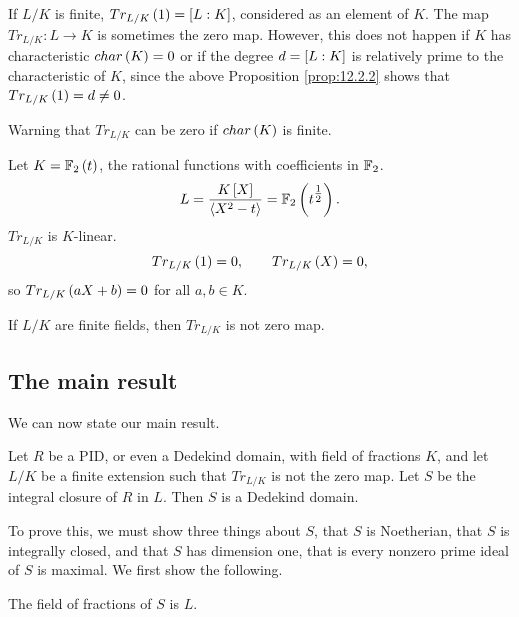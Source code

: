 \pagebreak

\begin{remark}
If $ L / K $ is finite, $ Tr_{L / K}\rb{1} = \sb{L : K} $, considered as an element of $ K $. The map $ Tr_{L / K} : L \to K $ is sometimes the zero map. However, this does not happen if $ K $ has characteristic $ char\rb{K} = 0 $ or if the degree $ d = \sb{L : K} $ is relatively prime to the characteristic of $ K $, since the above Proposition \ref{prop:12.2.2} shows that $ Tr_{L / K}\rb{1} = d \ne 0 $.
\end{remark}

Warning that $ Tr_{L / K} $ can be zero if $ char\rb{K} $ is finite.

\begin{example*}
Let $ K = \F_2\rb{t} $, the rational functions with coefficients in $ \F_2 $.
$$ L = \dfrac{K\sb{X}}{\ab{X^2 - t}} = \F_2\rb{t^{\tfrac{1}{2}}}. $$
$ Tr_{L / K} $ is $ K $-linear.
$$ Tr_{L / K}\rb{1} = 0, \qquad Tr_{L / K}\rb{X} = 0, $$
so $ Tr_{L / K}\rb{aX + b} = 0 $ for all $ a, b \in K $.
\end{example*}

\begin{proposition}
If $ L / K $ are finite fields, then $ Tr_{L / K} $ is not zero map.
\end{proposition}

\subsection{The main result}

We can now state our main result.

\begin{theorem}
Let $ R $ be a PID, or even a Dedekind domain, with field of fractions $ K $, and let $ L / K $ be a finite extension such that $ Tr_{L / K} $ is not the zero map. Let $ S $ be the integral closure of $ R $ in $ L $. Then $ S $ is a Dedekind domain.
\end{theorem}

To prove this, we must show three things about $ S $, that $ S $ is Noetherian, that $ S $ is integrally closed, and that $ S $ has dimension one, that is every nonzero prime ideal of $ S $ is maximal. We first show the following.

\begin{lemma}
The field of fractions of $ S $ is $ L $.
\end{lemma}

